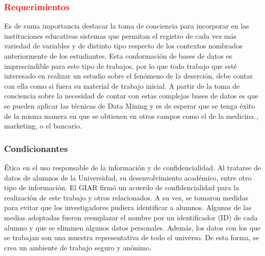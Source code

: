 
\subsubsection{\textcolor{red}{Requerimientos}}
Es de suma importancia destacar la toma de conciencia para incorporar en las instituciones educativas sistemas que permitan el registro de cada vez más variedad de variables y de distinto tipo respecto de los contextos nombrados anteriormente de los estudiantes.
Esta conformación de bases de datos es imprescindible para este tipo de trabajos, por lo que todo trabajo que esté interesado en realizar un estudio sobre el fenómeno de la deserción, debe contar con ella como si fuera su material de trabajo inicial.
A partir de la toma de conciencia sobre la necesidad de contar con estas complejas bases de datos es que se pueden aplicar las técnicas de Data Mining y es de esperar que se tenga éxito de la misma manera en que se obtienen en otros campos como el de la medicina \cite{Adnan2013DataReview}, marketing, o el bancario\cite{Kirkos2007DataStatements}.


\subsubsection{Condicionantes}\label{seccion:condicionantes}
Ética en el uso responsable de la información y de confidencialidad.
Al tratarse de datos de alumnos de la Universidad, su desenvolvimiento académico, entre otro tipo de información. El GIAR  firmó un acuerdo de confidencialidad para la realización de este trabajo y otros relacionados. A su vez, se tomaron medidas para evitar que los investigadores pudiera identificar a alumnos. Algunas de las medias adoptadas fueron reemplazar el nombre por un identificador (ID) de cada alumno y que se
eliminen algunos datos personales.
Además, los datos con los que se trabajan son una muestra representativa de todo el universo.
De esta forma, se crea un ambiente de trabajo seguro y anónimo.
